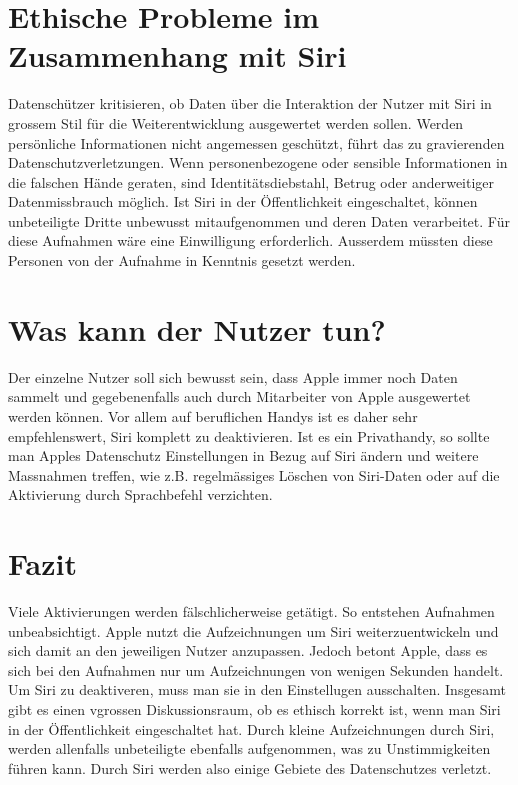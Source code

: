 \documentclass{article}
\begin{document}
\section{Ethische Probleme im Zusammenhang mit Siri}
Datenschützer kritisieren, ob Daten über die Interaktion der Nutzer mit Siri in grossem Stil für die Weiterentwicklung ausgewertet werden sollen. Werden persönliche Informationen nicht angemessen geschützt, führt das zu gravierenden Datenschutzverletzungen. Wenn personenbezogene oder sensible Informationen in die falschen Hände geraten, sind Identitätsdiebstahl, Betrug oder anderweitiger Datenmissbrauch möglich. Ist Siri in der Öffentlichkeit eingeschaltet, können unbeteiligte Dritte unbewusst mitaufgenommen und deren Daten verarbeitet.
Für diese Aufnahmen wäre eine Einwilligung erforderlich. Ausserdem müssten diese Personen von der Aufnahme in Kenntnis gesetzt werden.

\section{Was kann der Nutzer tun?}
Der einzelne Nutzer soll sich bewusst sein, dass Apple immer noch Daten sammelt und gegebenenfalls auch durch Mitarbeiter von Apple ausgewertet werden können. Vor allem auf beruflichen Handys ist es daher sehr empfehlenswert, Siri komplett zu deaktivieren. Ist es ein Privathandy, so sollte man Apples Datenschutz Einstellungen in Bezug auf Siri ändern und weitere Massnahmen treffen, wie z.B. regelmässiges Löschen von Siri-Daten oder auf die Aktivierung durch Sprachbefehl verzichten. 


\section{Fazit}
Viele Aktivierungen werden fälschlicherweise getätigt. So entstehen Aufnahmen unbeabsichtigt. Apple nutzt die Aufzeichnungen um Siri weiterzuentwickeln und sich damit an den jeweiligen Nutzer anzupassen. Jedoch betont Apple, dass es sich bei den Aufnahmen nur um Aufzeichnungen von wenigen Sekunden handelt. Um Siri zu deaktiveren, muss man sie in den Einstellugen ausschalten.
Insgesamt gibt es einen vgrossen Diskussionsraum, ob es ethisch korrekt ist, wenn man Siri in der Öffentlichkeit eingeschaltet hat. Durch kleine Aufzeichnungen durch Siri, werden allenfalls unbeteiligte ebenfalls aufgenommen, was zu Unstimmigkeiten führen kann. Durch Siri werden also einige Gebiete des Datenschutzes verletzt.


\end{document}
